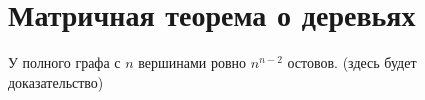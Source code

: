 \section{Матричная теорема о деревьях}

\begin{theorem}[Кэли]
	У полного графа с $n$ вершинами ровно $n^{n-2}$ остовов.
	(здесь будет доказательство)
\end{theorem}